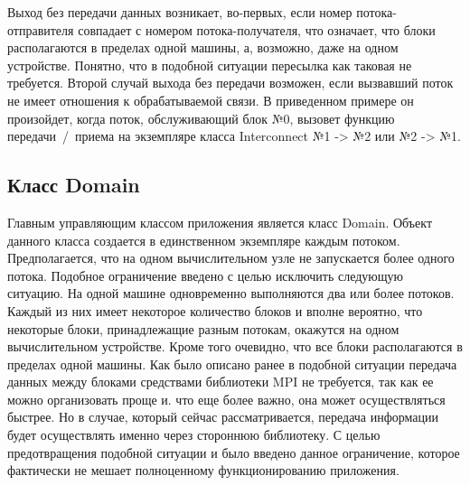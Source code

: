 \documentclass[a4paper, 14pt]{extarticle}
\theoremstyle{definition}
\begin{document}
\par Выход без передачи данных возникает, во-первых, если номер потока-отправителя совпадает с номером потока-получателя, что означает, что блоки располагаются в пределах одной машины, а, возможно, даже на одном устройстве. Понятно, что в подобной ситуации пересылка как таковая не требуется. Второй случай выхода без передачи возможен, если вызвавший поток не имеет отношения к обрабатываемой связи. В приведенном примере он произойдет, когда поток, обслуживающий блок №0, вызовет функцию передачи~/~приема на экземпляре класса Interconnect №1 -> №2 или №2 -> №1.


\subsection{Класс Domain}

\par Главным управляющим классом приложения является класс Domain. Объект данного класса создается в единственном экземпляре каждым потоком. Предполагается, что на одном вычислительном узле не запускается более одного потока. Подобное ограничение введено с целью исключить следующую ситуацию. На одной машине одновременно выполняются два или более потоков. Каждый из них имеет некоторое количество блоков и вполне вероятно, что некоторые блоки, принадлежащие разным потокам, окажутся на одном вычислительном устройстве. Кроме того очевидно, что все блоки располагаются в пределах одной машины. Как было описано ранее в подобной ситуации передача данных между блоками средствами библиотеки MPI не требуется, так как ее можно организовать проще и. что еще более важно, она может осуществляться быстрее. Но в случае, который сейчас рассматривается, передача информации будет осуществлять именно через стороннюю библиотеку. С целью предотвращения подобной ситуации и было введено данное ограничение, которое фактически не мешает полноценному функционированию приложения.
\end{document}
